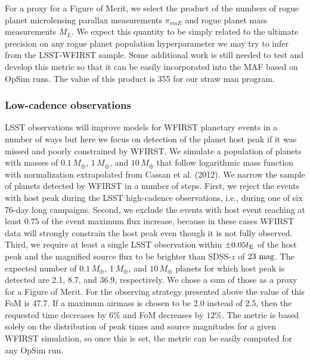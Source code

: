 For a proxy for a Figure of Merit, we select the product of the numbers of
rogue planet microlensing parallax measurements $\pi_{rm E}$
and rogue planet mass measurements $M_L$.
We expect this quantity to be simply related to the ultimate precision
on any rogue planet population hyperparameter we may try to infer from
the LSST-WFIRST sample.
Some additional
work is still needed to test and develop this metric so that it can be easily incorporated into the MAF based on OpSim runs.
The value of this product is 355 for our straw man program.


\subsubsection{Low-cadence observations}

LSST observations will improve models for WFIRST planetary events
in a number of ways but here we focus on detection of the planet
host peak if it was missed and poorly constrained by WFIRST. We simulate
a population of planets with masses of $0.1\,M_\oplus$, $1\,M_\oplus$,
and $10\,M_\oplus$ that follow logarithmic mass function with
normalization extrapolated from Cassan et al. (2012). We narrow the sample of
planets detected by WFIRST in a number of steps. First, we reject the events
with host peak during the LSST high-cadence observations, i.e., during one of six
76-day long campaigns. Second, we exclude the events with host event reaching
at least $0.75$ of the event maximum flux increase, because in these cases WFIRST
data will strongly constrain the host peak even though it is not fully observed.
Third, we require at least a single LSST observation within $\pm0.05t_{\rm E}$ of
the host peak and the magnified source flux to be brighter than SDSS-$z$ of $23~{\rm mag}$.
The expected number of $0.1\,M_\oplus$, $1\,M_\oplus$, and $10\,M_\oplus$
planets for which host peak is detected are 2.1, 8.7, and 36.9, respectively.
We chose a sum of those as a proxy for a Figure of Merit. For the observing strategy
presented above the value of this FoM is 47.7. If a maximum airmass is chosen to be
2.0 instead of 2.5, then the requested time decreases by $6\%$ and FoM decreases by $12\%$.
The metric is based solely on the distribution of peak times and source magnitudes
for a given WFIRST simulation, so once this is set, the metric can
be easily computed for any OpSim run.



